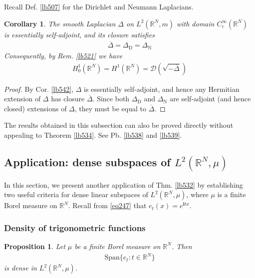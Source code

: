 \documentclass[12pt,b5paper,notitlepage]{article}
\theoremstyle{definition}
\theoremstyle{plain}
\newtheorem{pp}[df]{Proposition}
\newtheorem{co}[df]{Corollary}
\newcommand{\ovl}{\overline}
\newcommand{\Dom}{\mathscr{D}}
\newcommand{\Span}{\mathrm{Span}}
\newcommand{\im}{\mathbf{i}}
\newcommand{\Rbb}{\mathbb R}
\newcommand{\DD}{\Delta_{\mathrm D}}
\newcommand{\DN}{\Delta_{\mathrm N}}
\numberwithin{equation}{section}
\begin{document}
Recall Def. \ref{lb507} for the Dirichlet and Neumann Laplacians.

\begin{co}\label{lb544}
The smooth Laplacian $\Delta$ on $L^2(\Rbb^N,m)$ with domain $C_c^\infty(\Rbb^N)$ is essentially self-adjoint, and its closure satisfies
\begin{align*}
\ovl\Delta=\DD=\DN
\end{align*}
Consequently, by Rem. \ref{lb521} we have
\begin{align*}
H_0^1(\Rbb^N)=H^1(\Rbb^N)=\Dom(\sqrt{-\ovl\Delta})
\end{align*}
\end{co}


\begin{proof}
By Cor. \ref{lb542}, $\Delta$ is essentially self-adjoint, and hence any Hermitian extension of $\Delta$ has closure $\ovl\Delta$. Since both $\DD$ and $\DN$ are self-adjoint (and hence closed) extensions of $\Delta$, they must be equal to $\ovl\Delta$.
\end{proof}




The results obtained in this subsection can also be proved directly without appealing to Theorem \ref{lb534}. See Pb. \ref{lb538} and \ref{lb539}.



\subsection{Application: dense subspaces of $L^2(\Rbb^N,\mu)$}


In this section, we present another application of Thm. \ref{lb532} by establishing two useful criteria for dense linear subspaces of $L^2(\Rbb^N,\mu)$, where $\mu$ is a finite Borel measure on $\Rbb^N$. Recall from \eqref{eq247} that $e_t(x)=e^{\im tx}$.

\subsubsection{Density of trigonometric functions}

\begin{pp}\label{lb548}
Let $\mu$ be a finite Borel measure on $\Rbb^N$. Then
\begin{align*}
\Span\{e_t:t\in\Rbb^N\}
\end{align*} 
is dense in $L^2(\Rbb^N,\mu)$.
\end{pp}
\end{document}
